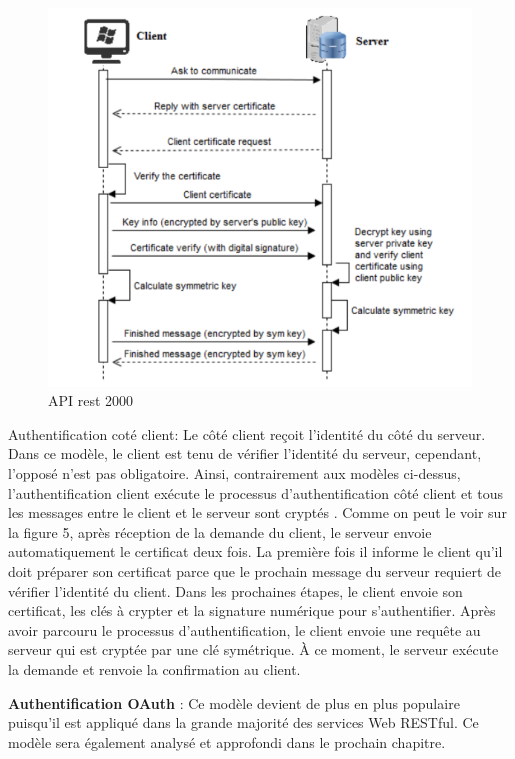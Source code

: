 \begin{figure}[! ht ]
			\centering
			\includegraphics[scale=.4]{./images/api_client_authentication.png}
			\caption {API rest 2000}
		\end{figure}

Authentification coté client: Le côté client reçoit l'identité du côté du serveur. Dans ce modèle, le client est tenu de vérifier l'identité du serveur, cependant, l'opposé n'est pas obligatoire. Ainsi, contrairement aux modèles ci-dessus, l'authentification client exécute le processus d'authentification côté client et tous les messages entre le client et le serveur sont cryptés \cite{18}.
Comme on peut le voir sur la figure 5, après réception de la demande du client, le serveur envoie automatiquement le certificat deux fois. La première fois il informe le client qu'il doit préparer son certificat  parce que le prochain message du serveur requiert de vérifier l'identité du client. Dans les prochaines étapes, le client envoie son certificat, les clés à crypter et la signature numérique pour s'authentifier. Après avoir parcouru le processus d'authentification, le client envoie une requête au serveur qui est cryptée par une clé symétrique. À ce moment, le serveur exécute la demande et renvoie la confirmation au client.

\textbf{Authentification OAuth} : Ce modèle devient de plus en plus populaire puisqu'il est appliqué dans la grande majorité des services Web RESTful. Ce modèle sera également analysé et approfondi dans le prochain chapitre.

